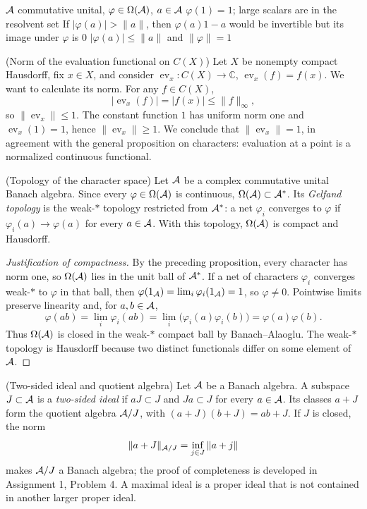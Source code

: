 \proofdiagram
{$\mathcal A$ commutative unital, $\varphi\in\Omega(\mathcal A)$, $a\in\mathcal A$}
{$\varphi(1)=1$; large scalars are in the resolvent set}
{If $|\varphi(a)|>\|a\|$, then $\varphi(a)1-a$ would be invertible but its image under $\varphi$ is $0$}
{$|\varphi(a)|\le\|a\|$ and $\|\varphi\|=1$}

\begin{cthejemplo}{(Norm of the evaluation functional on $C(X)$)}
Let $X$ be nonempty compact Hausdorff, fix $x\in X$, and consider
$\operatorname{ev}_x:C(X)\to\mathbb C$, $\operatorname{ev}_x(f)=f(x)$.
We want to calculate its norm. For any $f\in C(X)$,
\[
 |\operatorname{ev}_x(f)|=|f(x)|\le\|f\|_\infty,
\]
so $\|\operatorname{ev}_x\|\le1$. The constant function $1$
has uniform norm one and $\operatorname{ev}_x(1)=1$, hence
$\|\operatorname{ev}_x\|\ge1$. We conclude that
$\|\operatorname{ev}_x\|=1$, in agreement with the general proposition
on characters: evaluation at a point is a normalized continuous
functional.
\end{cthejemplo}

\begin{cthdefinicion}{(Topology of the character space)}
Let $\mathcal A$ be a complex commutative unital Banach algebra.
Since every $\varphi\in\Omega(\mathcal A)$ is continuous, $\Omega(\mathcal A)\subset\mathcal A^*$.
Its \emph{Gelfand topology} is the weak-$*$ topology
restricted from $\mathcal A^*$: a net $\varphi_i$ converges to $\varphi$ if
$\varphi_i(a)\to\varphi(a)$ for every $a\in\mathcal A$.
With this topology, $\Omega(\mathcal A)$ is compact and Hausdorff.
\end{cthdefinicion}

\begin{proof}[Justification of compactness]
By the preceding proposition, every character has norm one, so
$\Omega(\mathcal A)$ lies in the unit ball of $\mathcal A^*$. If a net of
characters $\varphi_i$ converges weak-$*$ to $\varphi$ in that ball,
then $\varphi(1_\mathcal A)=\lim_i\varphi_i(1_\mathcal A)=1$, so
$\varphi\ne0$. Pointwise limits preserve linearity and, for
$a,b\in\mathcal A$,
\[
 \varphi(ab)=\lim_i\varphi_i(ab)
 =\lim_i\bigl(\varphi_i(a)\varphi_i(b)\bigr)
 =\varphi(a)\varphi(b).
\]
Thus $\Omega(\mathcal A)$ is closed in the weak-$*$ compact ball by
Banach--Alaoglu. The weak-$*$ topology is Hausdorff because two
distinct functionals differ on some element of $\mathcal A$.
\end{proof}

\begin{cthdefinicion}{(Two-sided ideal and quotient algebra)}
Let $\mathcal A$ be a Banach algebra. A subspace $J\subset\mathcal A$ is a
\emph{two-sided ideal} if $aJ\subset J$ and
$Ja\subset J$ for every $a\in\mathcal A$. Its classes $a+J$ form the quotient algebra
$\mathcal A/J$, with $(a+J)(b+J)=ab+J$. If $J$ is closed, the norm
\[
 \|a+J\|_{\mathcal A/J}=\inf_{j\in J}\|a+j\|
\]
makes $\mathcal A/J$ a Banach algebra; the proof of completeness is developed in
Assignment 1, Problem 4. A maximal ideal is a proper ideal that is not contained in another
larger proper ideal.
\end{cthdefinicion}

